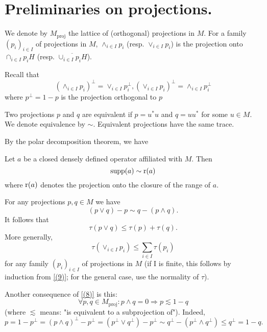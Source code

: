\section*{Preliminaries on projections.}
We denote by $M_{\text{proj}}$ the lattice of (orthogonal) projections in $M$. For a family $(p_i)_{i\in I}$ of projections in $M$, $\wedge_{i\in I}p_i$ (resp. $\vee_{i\in I}p_i$) is the projection onto $\cap_{i\in I}p_iH$ (resp. $\overline{\cup_{i\in I}p_iH}$).\par
Recall that
\begin{equation}
    (\wedge_{i\in I}p_i)^\perp=\vee_{i\in I}p_i^\perp, (\vee_{i\in I}p_i)^\perp=\wedge_{i\in I}p_i^\perp
\end{equation}
where $p^\perp=1-p$ is the projection orthogonal to $p$\par
Two projections $p$ and $q$ are equivalent if $p=u^*u$ and $q=uu^*$ for some $u\in M$. We denote equivalence by $\sim$. Equivalent projections have the same trace.\par
By the polar decomposition theorem, we have
\begin{lemma}
    Let $a$ be a closed densely defined operator affiliated
with $M$. Then
\[
    \operatorname{supp}(a)\sim \operatorname{r}(a)
\]
where $\operatorname{r}(a)$ denotes the projection onto the closure of the range of $a$.
\end{lemma}
For any projections $p,q\in M$ we have
\begin{equation}\label{(8)}
    (p\vee q)-p\sim q-(p\wedge q).
\end{equation}
It follows that
\begin{equation}\label{(9)}
    \tau(p\vee q)\leq \tau(p)+\tau(q).
\end{equation}
More generally,
\begin{equation}
    \tau(\vee_{i\in I}p_i)\leq \sum_{i\in I}\tau(p_i)
\end{equation}
for any family $(p_i)_{i\in I}$ of projections in $M$ (if I is finite, this follows by induction from \eqref{(9)}; for the general case, use the normality of $\tau$).\par
Another consequence of \eqref{(8)} is this:
\begin{equation}
    \forall p,q\in M_{\text{proj}}: p\wedge q=0\Rightarrow p\lesssim 1-q
\end{equation}
(where $\lesssim$ means: "is equivalent to a subprojection of"). Indeed,
\[
    p=1-p^\perp=(p\wedge q)^\perp-p^\perp=(p^\perp\vee q^\perp)-p^\perp\sim q^\perp-(p^\perp \wedge q^\perp)\leq q^\perp=1-q.
\]
